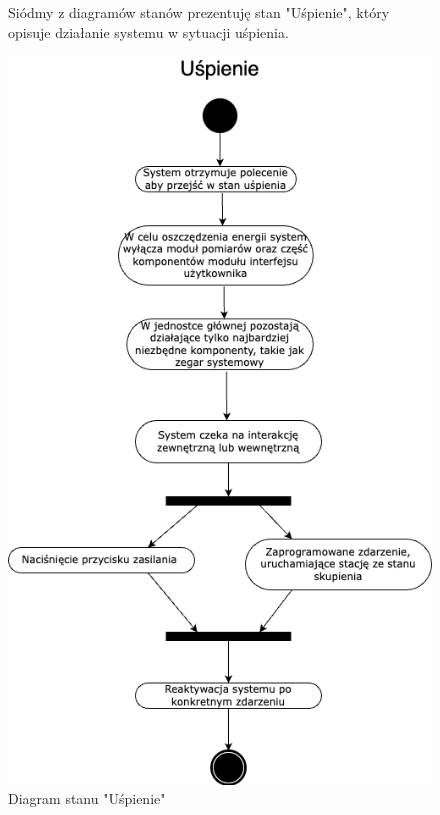 \documentclass{article}
\begin{document}
\begin{figure}
    \centering
    \begin{minipage}{0.6\textwidth}
        \centering
        \large Siódmy z diagramów stanów prezentuję stan "Uśpienie", który opisuje działanie systemu w sytuacji uśpienia.
    \end{minipage}
    \includegraphics[scale=0.5]{uspienie.png}
    \caption{Diagram stanu "Uśpienie"}
    \label{etykieta9}
\end{figure}
\end{document}
